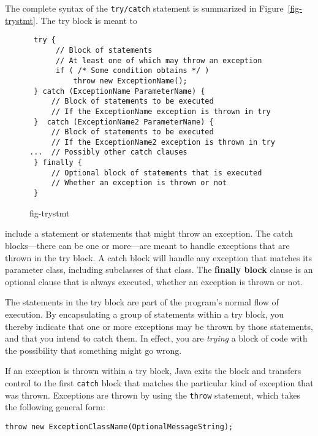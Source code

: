 \noindent The complete syntax of the {\tt try/catch} statement is
summarized in Figure~\ref{fig-trystmt}.  The try block is meant to
\begin{figure}[h!]
\jjjprogstart
\begin{jjjlisting}
\begin{lstlisting}
 try {
      // Block of statements
      // At least one of which may throw an exception
      if ( /* Some condition obtains */ )
          throw new ExceptionName();
 } catch (ExceptionName ParameterName) {
     // Block of statements to be executed
     // If the ExceptionName exception is thrown in try
 }  catch (ExceptionName2 ParameterName) {
     // Block of statements to be executed
     // If the ExceptionName2 exception is thrown in try
...  // Possibly other catch clauses
 } finally {
     // Optional block of statements that is executed
     // Whether an exception is thrown or not
 }
\end{lstlisting}
\end{jjjlisting}
{fig-trystmt}
\end{figure}
include a statement or statements that might throw an exception.  The
catch blocks---there can be one or more---are meant to handle
exceptions that are thrown in the try block.  A catch block will
handle any exception that matches its parameter class, including
subclasses of that class.  The {\bf finally block} clause is an
optional clause that is always executed, whether an exception is
thrown or not.



The statements in the try block are part of the program's normal flow
of execution.  By encapsulating a group of statements within a
try block, you thereby indicate that one or more exceptions may be
thrown by those statements, and that you intend to catch them.   In
effect, you are {\it trying} a block of code with the possibility that
something might go wrong.

If an exception is thrown within a try block, Java exits the block and
transfers control to the first {\tt catch} block that matches the
particular kind of exception that was thrown.   Exceptions are thrown
by using the {\tt throw} statement, which takes the following general
form:

\begin{jjjlisting}
\begin{lstlisting}
throw new ExceptionClassName(OptionalMessageString);
\end{lstlisting}
\end{jjjlisting}

